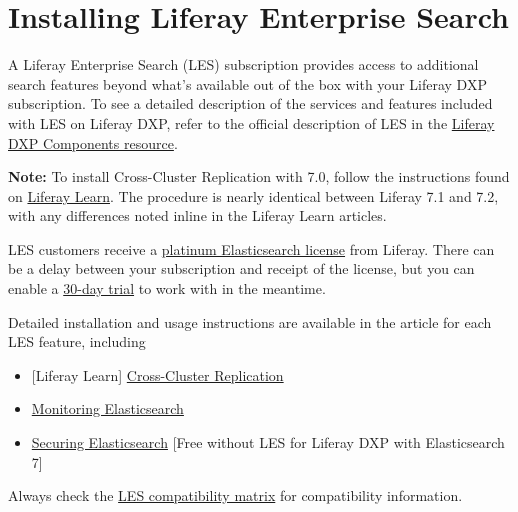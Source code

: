 \chapter{Installing Liferay Enterprise
Search}\label{installing-liferay-enterprise-search}

A Liferay Enterprise Search (LES) subscription provides access to
additional search features beyond what's available out of the box with
your Liferay DXP subscription. To see a detailed description of the
services and features included with LES on Liferay DXP, refer to the
official description of LES in the
\href{https://help.liferay.com/hc/en-us/articles/360014400932}{Liferay
DXP Components resource}.

\noindent\hrulefill

\textbf{Note:} To install Cross-Cluster Replication with 7.0, follow the
instructions found on
\href{https://learn.liferay.com/dxp/latest/en/using-search/liferay-enterprise-search/cross-cluster-replication/cross-cluster-replication.html}{Liferay
Learn}. The procedure is nearly identical between Liferay 7.1 and 7.2,
with any differences noted inline in the Liferay Learn articles.

\noindent\hrulefill

LES customers receive a
\href{https://www.elastic.co/subscriptions}{platinum Elasticsearch
license} from Liferay. There can be a delay between your subscription
and receipt of the license, but you can enable a
\href{https://www.elastic.co/guide/en/elasticsearch/reference/7.x/start-trial.html}{30-day
trial} to work with in the meantime.

Detailed installation and usage instructions are available in the
article for each LES feature, including

\begin{itemize}
\tightlist
\item
  {[}Liferay Learn{]}
  \href{https://learn.liferay.com/dxp/latest/en/using-search/liferay-enterprise-search/cross-cluster-replication/cross-cluster-replication.html}{Cross-Cluster
  Replication}
\item
  \href{/docs/7-1/deploy/-/knowledge_base/d/monitoring-product}{Monitoring
  Elasticsearch}
\item
  \href{/docs/7-1/deploy/-/knowledge_base/d/installing-liferay-enterprise-search-security}{Securing
  Elasticsearch} {[}Free without LES for Liferay DXP with Elasticsearch
  7{]}
\end{itemize}

Always check the
\href{https://help.liferay.com/hc/en-us/articles/360016511651\#Liferay-Enterprise-Search}{LES
compatibility matrix} for compatibility information.

